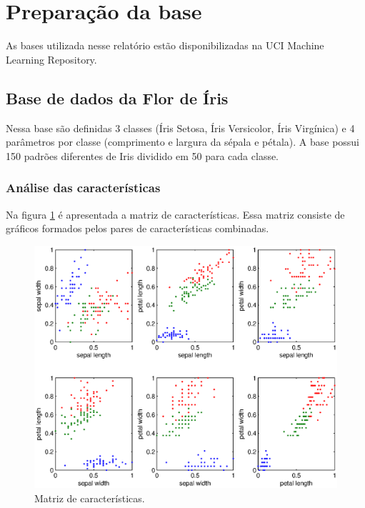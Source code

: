 \documentclass[preprint,12pt]{elsarticle}
\begin{document}

\section{Preparação da base}

As bases utilizada nesse relatório estão disponibilizadas na UCI Machine Learning Repository. \citep{UCI152015}

\subsection{Base de dados da Flor de Íris}

Nessa base são definidas 3 classes (Íris Setosa, Íris Versicolor, Íris Virgínica) e 4 parâmetros por classe (comprimento e largura da sépala e pétala). A base possui 150 padrões diferentes de Iris dividido em 50 para cada classe.

\subsubsection{Análise das características}
\label{sec:examples}

Na figura \ref{fig:featuresIris} é apresentada a matriz de características. Essa matriz consiste de gráficos formados pelos pares de características combinadas.


\begin{figure}[H]
	\centering
	
	\includegraphics[height=9cm]{figure/myfig.eps}
	
	
	\caption{Matriz de características.}
	\label{fig:featuresIris}
\end{figure}
\end{document}

